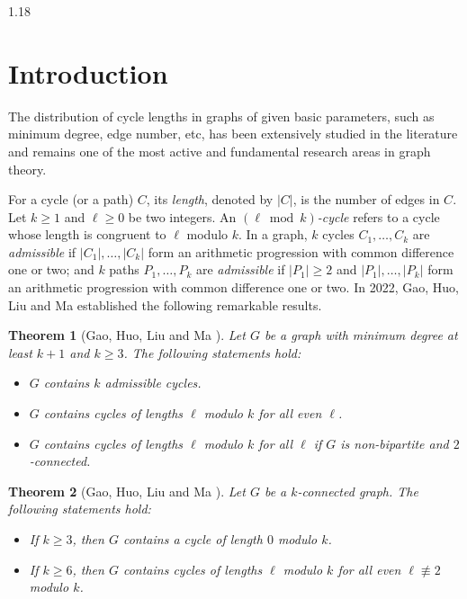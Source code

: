 \documentclass[10pt]{article}
\newtheorem{theorem}{Theorem}[section]
\begin{document}
\begin{spacing}{1.18}
\section{Introduction}

The distribution of cycle lengths in graphs of given basic parameters, such as minimum degree, edge number, etc, has been extensively studied in the literature and remains one of the most active and fundamental research areas in graph theory. 

For a cycle (or a path) $C$, its {\em length}, denoted by $|C|$, is the number of edges in $C$. Let $k\geqslant 1$ and $\ell\geqslant 0$ be two integers. An {\em $(\ell\bmod k)$-cycle} refers to a cycle whose length is congruent to $\ell$ modulo $k$. In a graph, $k$ cycles $C_1,\ldots, C_k$ are {\em admissible} if $|C_1|, \ldots, |C_k|$ form an arithmetic progression with common difference one or two; and $k$ paths $P_1,\ldots, P_k$ are {\em admissible} if $|P_1|\geqslant 2$ and $|P_1|, \ldots, |P_k|$ form an arithmetic progression with common difference one or two. In 2022, Gao, Huo, Liu and Ma \cite{G+22} established the following remarkable results.

\begin{theorem}[Gao, Huo, Liu and Ma \cite{G+22}]\label{thm: base}
    Let $G$ be a graph with minimum degree at least $k+1$ and $k\geqslant 3$. The following statements hold: 
    \begin{itemize}
        \item [(1)] $G$ contains $k$ admissible cycles.
        \item [(2)] $G$ contains cycles of lengths $\ell$ modulo $k$ for all even $\ell$.
        \item [(3)] $G$ contains cycles of lengths $\ell$ modulo $k$ for all $\ell$ if $G$ is non-bipartite and $2$-connected. 
    \end{itemize}
\end{theorem}

\begin{theorem}[Gao, Huo, Liu and Ma \cite{G+22}]\label{thm: k-con-lmodk}
    Let $G$ be a $k$-connected graph. The following statements hold: 
    \begin{itemize}
        \item [(1)] If $k\geqslant 3$, then $G$ contains a cycle of length $0$ modulo $k$. 
        \item [(2)] If $k\geqslant 6$, then $G$ contains cycles of lengths $\ell$ modulo $k$ for all even $\ell\not\equiv 2$ modulo $k$.
    \end{itemize}
\end{theorem}


\end{spacing}
\end{document}
